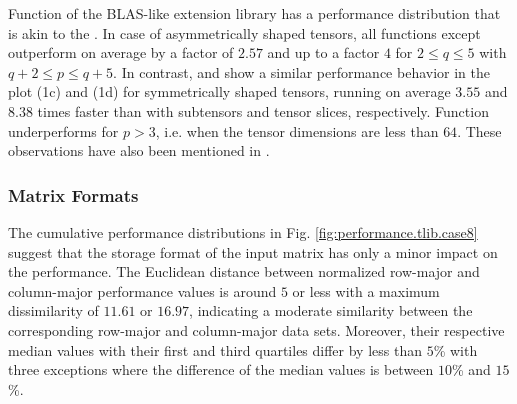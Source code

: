 Function  of the BLAS-like extension library has a performance distribution that is akin to the .
In case of asymmetrically shaped tensors, all functions except  outperform  on average by a factor of $2.57$ and up to a factor $4$ for $2 \leq q\leq5$ with $q+2 \leq p \leq q+5$. %
In contrast,  and  show a similar performance behavior in the plot (1c) and (1d) for symmetrically shaped tensors, running on average $3.55$ and $8.38$ times faster than  with subtensors and tensor slices, respectively.
Function  underperforms for $p>3$, i.e. when the tensor dimensions are less than $64$.
These observations have also been mentioned in \cite{bassoy:2024:ttm}.



\subsubsection{Matrix Formats}
The cumulative performance distributions in Fig. \ref{fig:performance.tlib.case8} suggest that the storage format of the input matrix has only a minor impact on the performance.
The Euclidean distance between normalized row-major and column-major performance values is around $5$ or less with a maximum dissimilarity of $11.61$ or $16.97$, indicating a moderate similarity between the corresponding row-major and column-major data sets.
Moreover, their respective median values with their first and third quartiles differ by less than $5$\% with three exceptions where the difference of the median values is between $10$\% and $15$\%.


